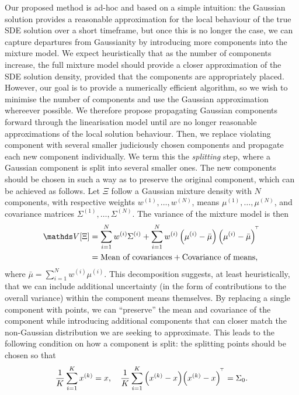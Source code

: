 Our proposed method is ad-hoc and based on a simple intuition: the Gaussian solution provides a reasonable approximation for the local behaviour of the true SDE solution over a short timeframe, but once this is no longer the case, we can capture departures from Gaussianity by introducing more components into the mixture model.
We expect heuristically that as the number of components increase, the full mixture model should provide a closer approximation of the SDE solution density, provided that the components are appropriately placed.
However, our goal is to provide a numerically efficient algorithm, so we wish to minimise the number of components and use the Gaussian approximation whereever possible.
We therefore propose propagating Gaussian components forward through the linearisation model until are no longer reasonable approximations of the local solution behaviour.
Then, we replace violating component with several smaller judiciously chosen components and propagate each new component individually.
We term this the \emph{splitting} step, where a Gaussian component is split into several smaller ones.
The new components should be chosen in such a way as to preserve the original component, which can be achieved as follows.
Let \(\Xi\) follow a Gaussian mixture density with \(N\) components, with respective weights \(w^{(1)}, \dotsc, w^{(N)}\), means \(\mu^{(1)},\dotsc,\mu^{(N)}\), and covariance matrices \(\Sigma^{(1)},\dotsc,\Sigma^{(N)}\).
The variance of the mixture model is then
\begin{align*}
	\var{\Xi} & = \sum_{i=1}^{N}{w^{(i)}\Sigma^{(i)}} + \sum_{i=1}^{N}{w^{(i)}\left(\mu^{(i)} - \bar{\mu}\right)\left(\mu^{(i)} - \bar{\mu}\right)^{\T}} \\
	          & = \text{Mean of covariances} + \text{Covariance of means},
\end{align*}
where \(\bar{\mu} = \sum_{i=1}^{N}{w^{(i)}\mu^{(i)}}\).
This decomposition suggests, at least heuristically, that we can include additional uncertainty (in the form of contributions to the overall variance) within the component means themselves.
By replacing a single component with points, we can ``preserve'' the mean and covariance of the component while introducing additional components that can closer match the non-Gaussian distribution we are seeking to approximate.
This leads to the following condition on how a component is split: the splitting points should be chosen so that
\begin{equation}
	\frac{1}{K}\sum_{i=1}^K{x^{(k)}} = x, \quad \frac{1}{K}\sum_{i=1}^{K}{\left(x^{(k)} - x\right)\!\left(x^{(k)} - x\right)^{^{\!\top}}} = \Sigma_0.
	\label{eqn:cov_split_points}
\end{equation}
